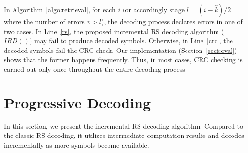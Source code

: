 \documentclass[10pt,journal,letterpaper,compsoc]{IEEEtran}
\newcommand{\0}{{\bf 0}}
\begin{document}
In Algorithm~\ref{algo:retrieval}, for each $i$ (or accordingly stage $l =
(i-\hat{k})/2$ where the number of errors $v > l$), the decoding process declares
errors in one of two cases. In Line~\ref{rs}, the proposed incremental RS decoding
algorithm ($IRD()$) may fail to produce decoded symbols. Otherwise, in
Line~\ref{crc}, the decoded symbols fail the CRC check. Our implementation
(Section~\ref{sect:eval}) shows that the former happens frequently. Thus, in
most cases, CRC checking is carried out only once throughout the entire
decoding process.
\section{Progressive Decoding}
\label{sect:algo}
In this section, we present the incremental RS decoding algorithm. Compared to
the classic RS decoding, it utilizes intermediate computation results and
decodes incrementally as more symbols become available. 
\end{document}
